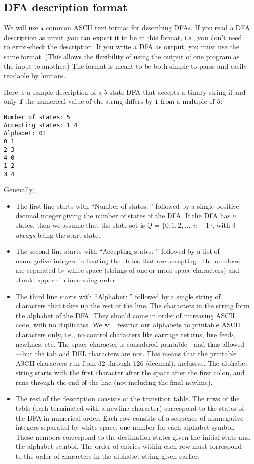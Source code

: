 \subsection*{DFA description format}

We will use a common ASCII text format for describing DFAs.
If you read a DFA description as input, you can expect it to be in
this format, i.e., you don't need to error-check the description.
If you write a DFA as output, you must use the same format.
(This allows the flexibility of using the output of one program as the
input to another.)
The format is meant to be both simple to parse and easily readable by humans.

\newpage
Here is a sample description of a $5$-state DFA that accepts a
binary string if and only if the numerical value of the string differs by $1$ from
a multiple of $5$:
\begin{verbatim}
Number of states: 5
Accepting states: 1 4
Alphabet: 01
0 1
2 3
4 0
1 2
3 4
\end{verbatim}

Generally,
\begin{itemize}
\item
The first line starts with ``Number of states: '' followed by a
single positive decimal integer giving the number of states of the DFA\@.
If the DFA has $n$ states, then we assume that the state set
is $Q = \{0,1,2,\ldots, n-1\}$, with $0$ \emph{always} being the start state.

\item
The second line starts with ``Accepting states: '' followed by a list
of nonnegative integers indicating the states that are accepting.
The numbers are separated by white space (strings of one or more space
characters) and should appear in increasing order.

\item
The third line starts with ``Alphabet: '' followed by a single string of
characters that takes up the rest of the line.
The characters in the string form the alphabet of the DFA\@.
They should come in order of increasing ASCII code, with no duplicates.
We will restrict our alphabets to printable ASCII characters only,
i.e., no control characters like carriage returns, line feeds, newlines, etc.
The space character is considered printable---and thus allowed---but the
tab and DEL characters are not.
This means that the printable ASCII characters run from 32 through 126
(decimal), inclusive.
The alphabet string starts with the first character after the space
after the first colon, and runs through the end of the line (not
including the final newline).

\item
The rest of the description consists of the transition table.
The rows of the table (each terminated with a newline character)
correspond to the states of the DFA in numerical order.
Each row consists of a sequence of nonnegative integers separated by white
space, one number for each alphabet symbol.
These numbers correspond to the destination states given the initial
state and the alphabet symbol.
The order of entries within each row must correspond to the order
of characters in the alphabet string given earlier.
\end{itemize}

